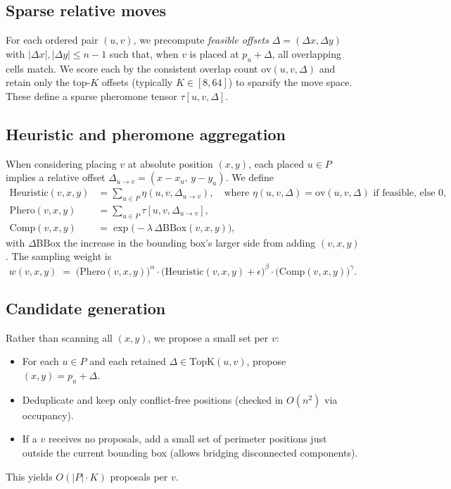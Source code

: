 \documentclass[11pt]{article}
\begin{document}
\subsection{Sparse relative moves}
For each ordered pair $(u,v)$, we precompute \emph{feasible offsets} $\Delta=(\Delta x,\Delta y)$ with $|\Delta x|,|\Delta y|\le n-1$ such that, when $v$ is placed at $p_u+\Delta$, all overlapping cells match. We score each by the consistent overlap count $\mathrm{ov}(u,v,\Delta)$ and retain only the top-$K$ offsets (typically $K\in[8,64]$) to sparsify the move space. These define a sparse pheromone tensor $\tau[u,v,\Delta]$.

\subsection{Heuristic and pheromone aggregation}
When considering placing $v$ at absolute position $(x,y)$, each placed $u\in P$ implies a relative offset $\Delta_{u\to v}=(x-x_u,\,y-y_u)$. We define
\begin{align*}
\mathrm{Heuristic}(v,x,y) &= \sum_{u\in P} \eta(u,v,\Delta_{u\to v}), \quad \text{where } \eta(u,v,\Delta)=\mathrm{ov}(u,v,\Delta)\text{ if feasible, else }0,\\
\mathrm{Phero}(v,x,y) &= \sum_{u\in P} \tau[u,v,\Delta_{u\to v}],\\
\mathrm{Comp}(v,x,y) &= \exp\big(-\lambda\,\Delta\mathrm{BBox}(v,x,y)\big),
\end{align*}
with $\Delta\mathrm{BBox}$ the increase in the bounding box's larger side from adding $(v,x,y)$. The sampling weight is
\begin{equation}
 w(v,x,y) \;=\; \big(\mathrm{Phero}(v,x,y)\big)^{\alpha}\cdot\big(\mathrm{Heuristic}(v,x,y)+\epsilon\big)^{\beta}\cdot\big(\mathrm{Comp}(v,x,y)\big)^{\gamma}.
\end{equation}

\subsection{Candidate generation}
Rather than scanning all $(x,y)$, we propose a small set per $v$:
\begin{itemize}
  \item For each $u\in P$ and each retained $\Delta\in\mathrm{TopK}(u,v)$, propose $(x,y)=p_u+\Delta$.
  \item Deduplicate and keep only conflict-free positions (checked in $O(n^2)$ via occupancy).
  \item If a $v$ receives no proposals, add a small set of perimeter positions just outside the current bounding box (allows bridging disconnected components).
\end{itemize}
This yields $O(|P|\cdot K)$ proposals per $v$.
\end{document}
